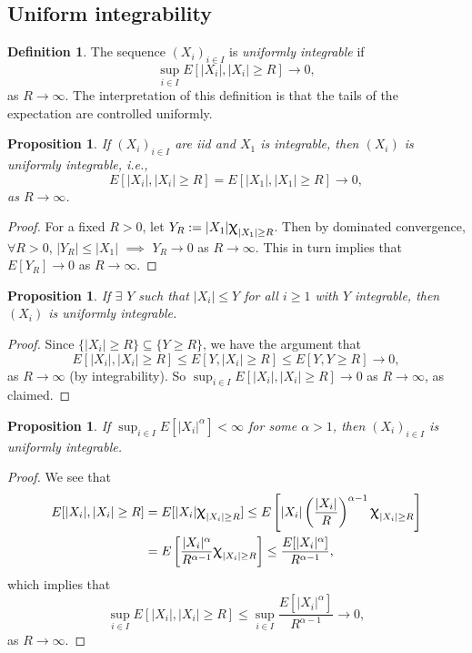 \documentclass[12pt,reqno]{article}
\renewcommand{\emph}[1]{\textit{#1}}
\theoremstyle{plain}
\newtheorem{prop}[theorem]{Proposition}
\theoremstyle{definition}
\newtheorem{definition}[theorem]{Definition}
\renewcommand{\chi}{\scalebox{1.25}{$\upchi$}}
\begin{document}
\subsection{Uniform integrability} 

\begin{definition}
The sequence $(X_i)_{i \in I}$ is \emph{uniformly integrable} if 
\[
\sup_{i \in I} E[|X_i|, |X_i| \geq R] \longrightarrow 0, 
\]
as $R \rightarrow \infty$. The interpretation of this definition is that 
the tails of the expectation are controlled uniformly. 
\end{definition} 

\begin{prop} 
If $(X_i)_{i \in I}$ are iid and $X_1$ is integrable, then $(X_i)$ is 
uniformly integrable, i.e., 
\[
E[|X_i|, |X_i| \geq R] = E[|X_1|, |X_1| \geq R] \longrightarrow 0, 
\]
as $R \rightarrow \infty$. 
\end{prop}
\begin{proof} 
For a fixed $R > 0$, let $Y_R := |X_1| \chi_{|X_1| \geq R}$. Then by 
dominated convergence, $\forall R > 0$, $|Y_R| \leq |X_1|$ $\implies$ 
$Y_R \rightarrow 0$ as $R \rightarrow \infty$. This in turn implies that 
$E[Y_R] \rightarrow 0$ as $R \rightarrow \infty$. 
\end{proof} 

\begin{prop} 
If $\exists$ $Y$ such that $|X_i| \leq Y$ for all $i \geq 1$ with $Y$ 
integrable, then $(X_i)$ is uniformly integrable. 
\end{prop}
\begin{proof} 
Since $\{|X_i| \geq R\} \subseteq \{Y \geq R\}$, we have the argument that 
\[
E[|X_i|, |X_i| \geq R] \leq E[Y,|X_i| \geq R] \leq 
     E[Y, Y \geq R] \longrightarrow 0, 
\]
as $R \rightarrow \infty$ (by integrability). 
So $\sup_{i \in I} E[|X_i|, |X_i| \geq R] \rightarrow 0$ as 
$R \rightarrow \infty$, as claimed. 
\end{proof} 

\begin{prop} 
If $\sup_{i \in I} E[|X_i|^{\alpha}] < \infty$ for some $\alpha > 1$, then 
$(X_i)_{i \in I}$ is uniformly integrable. 
\end{prop}
\begin{proof} 
We see that 
\begin{align*} 
E[|X_i|, |X_i| \geq R] & = E[|X_i| \chi_{|X_i| \geq R}] \leq 
     E\left[|X_i| \left(\frac{|X_i|}{R}\right)^{\alpha-1} 
     \chi_{|X_i| \geq R}\right] \\ 
     & = E\left[\frac{|X_i|^{\alpha}}{R^{\alpha-1}} 
     \chi_{|X_i| \geq R}\right] \leq 
     \frac{E[|X_i|^{\alpha}]}{R^{\alpha-1}}, 
\end{align*} 
which implies that 
\[
\sup_{i \in I} E[|X_i|, |X_i| \geq R] \leq \sup_{i \in I} 
     \frac{E[|X_i|^{\alpha}]}{R^{\alpha-1}} \longrightarrow 0, 
\]
as $R \rightarrow \infty$. 
\end{proof} 
\end{document}

